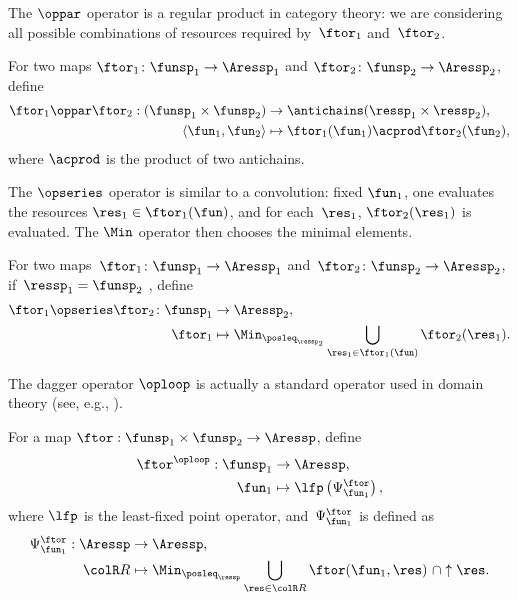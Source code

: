 The $\oppar$ operator is a regular product in category theory: we
are considering all possible combinations of resources required by~$\ftor_{1}$
and~$\ftor_{2}$.
\begin{definition}
\label{def:opmaps}For two maps $\ftor_{1}\colon\funsp_{1}\rightarrow\Aressp_{1}$
and $\ftor_{2}\colon\funsp_{2}\rightarrow\Aressp_{2}$, define
\begin{align*}
\ftor_{1}\oppar\ftor_{2}:(\funsp_{1}\times\funsp_{2}) & \rightarrow\antichains(\ressp_{1}\times\ressp_{2}),\\
\left\langle \fun_{1},\fun_{2}\right\rangle  & \mapsto\ftor_{1}(\fun_{1})\acprod\ftor_{2}(\fun_{2}),
\end{align*}
where $\acprod$ is the product of two antichains.
\end{definition}
The $\opseries$ operator is similar to a convolution: fixed $\fun_{1}$,
one evaluates the resources $\res_{1}\in\ftor_{1}(\fun)$, and for
each~$\res_{1}$, $\ftor_{2}(\res_{1})$ is evaluated. The $\Min$
operator then chooses the minimal elements.
\begin{definition}
\label{def:opseries}For two maps~$\ftor_{1}\colon\funsp_{1}\rightarrow\Aressp_{1}$
and~$\ftor_{2}\colon\funsp_{2}\rightarrow\Aressp_{2}$, if~$\ressp_{1}=\funsp_{2}$
, define
\begin{align*}
{\displaystyle \ftor_{1}\opseries\ftor_{2}\colon\funsp_{1}} & \rightarrow\Aressp_{2},\\
\ftor_{1} & \mapsto\Min_{\posleq_{\ressp_{2}}}\bigcup_{\res_{1}\in\ftor_{1}(\fun)}\ftor_{2}(\res_{1}).
\end{align*}

\end{definition}


The dagger operator $\oploop$ is actually a standard operator used
in domain theory (see, e.g., \cite[II-2.29]{gierz03continuous}).
\begin{definition}
\label{def:oploop}For a map $\ftor:\funsp_{1}\times\funsp_{2}\rightarrow\Aressp$,
define
\begin{align}
\ftor^{\oploop}:\funsp_{1} & \rightarrow\Aressp,\nonumber \\
\fun_{1} & \mapsto\lfp\left(\Psi_{\fun_{1}}^{\ftor}\right),\label{eq:lfp}
\end{align}
where $\lfp$ is the least-fixed point operator, and~$\Psi_{\fun_{1}}^{\ftor}$
is defined as
\begin{align*}
\Psi_{\fun_{1}}^{\ftor}:\Aressp & \rightarrow\Aressp,\\
{\colR R} & \mapsto\Min_{\posleq_{\ressp}}\bigcup_{\res\in{\colR R}}\ftor(\fun_{1},\res)\ \cap\uparrow\res.
\end{align*}
\end{definition}

